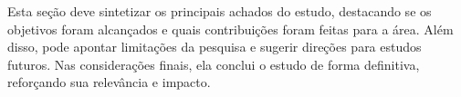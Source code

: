 Esta seção deve sintetizar os principais achados do estudo, destacando se os
objetivos foram alcançados e quais contribuições foram feitas para a área. Além
disso, pode apontar limitações da pesquisa e sugerir direções para estudos
futuros. Nas considerações finais, ela conclui o estudo de forma definitiva,
reforçando sua relevância e impacto.

